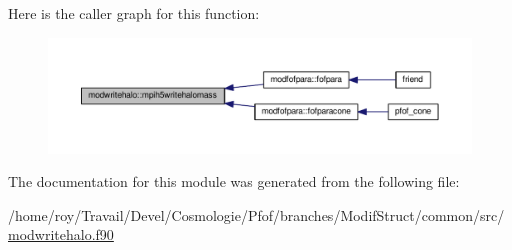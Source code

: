 Here is the caller graph for this function\-:\nopagebreak
\begin{figure}[H]
\begin{center}
\leavevmode
\includegraphics[width=350pt]{classmodwritehalo_a4504dad75b760d800dd55e3cb9b90e71_icgraph}
\end{center}
\end{figure}




The documentation for this module was generated from the following file\-:\begin{DoxyCompactItemize}
\item 
/home/roy/\-Travail/\-Devel/\-Cosmologie/\-Pfof/branches/\-Modif\-Struct/common/src/\hyperlink{modwritehalo_8f90}{modwritehalo.\-f90}\end{DoxyCompactItemize}
